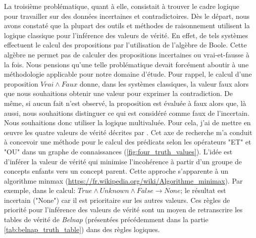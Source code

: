 \begin{refsegment}
La troisième problématique, quant à elle, consistait à trouver le cadre logique pour travailler sur des données incertaines et contradictoires. Dès le départ, nous avons constaté que la plupart des outils et méthodes de raisonnement utilisent la logique classique pour l'inférence des valeurs de vérité. En effet, de tels systèmes effectuent le calcul des propositions par l'utilisation de l'algèbre de Boole. Cette algèbre ne permet pas de calculer des propositions incertaines ou vrai-et-fausse à la fois. Nous pensions qu'une telle problématique devait forcément aboutir à une méthodologie applicable pour notre domaine d'étude. Pour rappel, le calcul d'une proposition $Vrai \land Faux$ donne, dans les systèmes classiques, la valeur faux alors que nous souhaitions obtenir une valeur pour exprimer la contradiction. De même, si aucun fait n'est observé, la proposition est évaluée à faux alors que, là aussi, nous souhaitions distinguer ce qui est considéré comme faux de l'incertain. Nous souhaitions donc utiliser la logique multivaluée. Pour cela, j'ai de mettre en œuvre les quatre valeurs de vérité décrites par \citeauthor{belnap77}\cite{belnap77}. Cet axe de recherche m'a conduit à  concevoir une méthode pour le calcul des prédicats selon les opérateurs "ET" et "OU" dans un graphe de connaissances (\cref{fig:four_truth_values}). L'idée est d'inférer la valeur de vérité qui minimise l'incohérence à partir  d'un groupe de concepts enfants vers un concept parent. Cette approche s'apparente à un algorithme minmax \cite{aho1989} (\url{https://fr.wikipedia.org/wiki/Algorithme_minimax}). Par exemple, dans le calcul: $ True \land Unknown \land False \to None$; le résultat est incertain ("None") car il est prioritaire sur les autres valeurs. Ces règles de priorité pour l'inférence des valeurs de vérité sont un moyen de retranscrire les tables de vérité de \textit{Belnap} (présentées précédemment dans la partie  \cref{tab:belnap_truth_table}) dans des règles logiques.


\end{refsegment}

